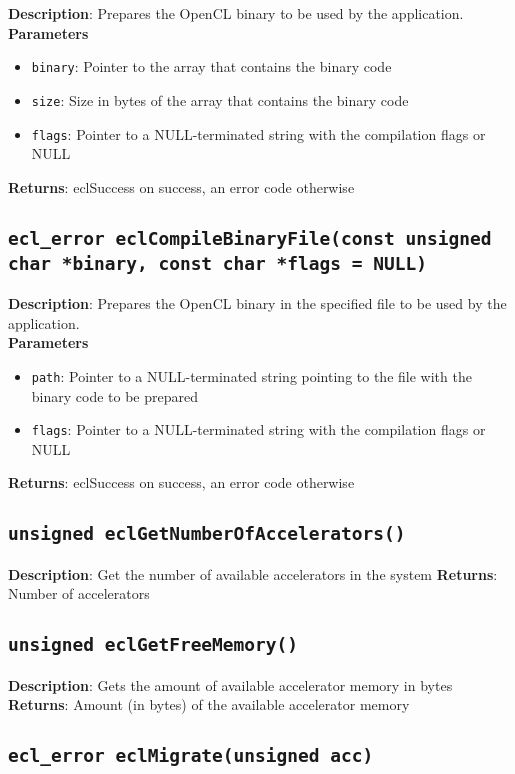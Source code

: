 \textbf{Description}: Prepares the OpenCL binary to be used by the application.  \\
\textbf{Parameters}
\begin{itemize}
  \item \texttt{binary}: Pointer to the array that contains the binary code
  \item \texttt{size}: Size in bytes of the array that contains the binary code
  \item \texttt{flags}: Pointer to a NULL\hyp{}terminated string with the compilation flags or 
NULL
\end{itemize}
\textbf{Returns}: eclSuccess on success, an error code otherwise

\subsection{\texttt{ecl\_error eclCompileBinaryFile(const unsigned char *binary, const char 
*flags = NULL)}}

\textbf{Description}: Prepares the OpenCL binary in the specified file to be used by the application.  \\
\textbf{Parameters}
\begin{itemize}
  \item \texttt{path}: Pointer to a NULL\hyp{}terminated string pointing to the file with the binary 
  code to be prepared
  \item \texttt{flags}: Pointer to a NULL\hyp{}terminated string with the compilation flags or NULL
\end{itemize}
\textbf{Returns}: eclSuccess on success, an error code otherwise

\subsection{\texttt{unsigned eclGetNumberOfAccelerators()}}

\textbf{Description}: Get the number of available accelerators in the system
\textbf{Returns}: Number of accelerators

\subsection{\texttt{unsigned eclGetFreeMemory()}}

\textbf{Description}: Gets the amount of available accelerator memory in bytes
\textbf{Returns}: Amount (in bytes) of the available accelerator memory

\subsection{\texttt{ecl\_error eclMigrate(unsigned acc)}}

